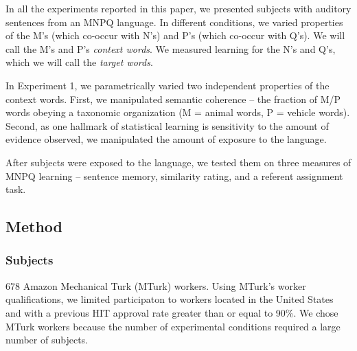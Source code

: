 \documentclass[man,floatsintext]{apa6}
\begin{document}
In all the experiments reported in this paper, we presented subjects with auditory sentences from an MNPQ language. In different conditions, we varied properties of the M's (which co-occur with N's) and P's (which co-occur with Q's). We will call the M's and P's \emph{context words}. We measured learning for the N's and Q's, which we will call the \emph{target words}.

In Experiment 1, we parametrically varied two independent properties of the context words. First, we manipulated semantic coherence -- the fraction of M/P words obeying a taxonomic organization (M = animal words, P = vehicle words). Second, as one hallmark of statistical learning is sensitivity to the amount of evidence observed, we manipulated the amount of exposure to the language.

After subjects were exposed to the language, we tested them on three measures of MNPQ learning -- sentence memory, similarity rating, and a referent assignment task.

\subsection{Method}

\subsubsection{Subjects}
678 Amazon Mechanical Turk (MTurk) workers. Using MTurk's worker qualifications, we limited participaton to workers located in the United States and with a previous HIT approval rate greater than or equal to 90\%. We chose MTurk workers because the number of experimental conditions required a large number of subjects.
\end{document}
